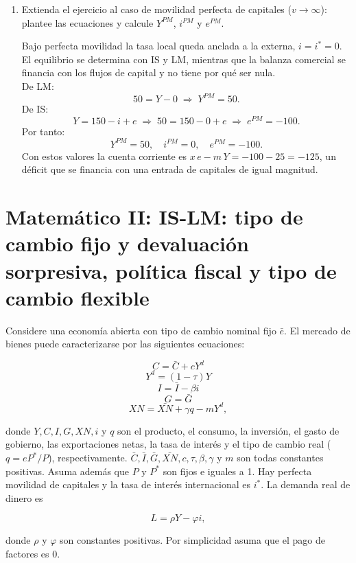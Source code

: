 \documentclass[a4paper]{article}
\begin{document}
\begin{enumerate}
  \item[c)] Extienda el ejercicio al caso de movilidad perfecta de capitales (\(v\to\infty\)): plantee las ecuaciones y calcule \(Y^{PM}\), \(i^{PM}\) y \(e^{PM}\).
  \begin{solution}
  Bajo perfecta movilidad la tasa local queda anclada a la externa, \(i = i^* = 0\). El equilibrio se determina con IS y LM, mientras que la balanza comercial se financia con los flujos de capital y no tiene por qué ser nula.\\
  De LM:
  \[
    50 = Y - 0
    \;\Longrightarrow\;
    Y^{PM} = 50.
  \]
  De IS:
  \[
    Y = 150 - i + e
    \;\Longrightarrow\;
    50 = 150 - 0 + e
    \;\Longrightarrow\;
    e^{PM} = -100.
  \]
  Por tanto:
  \[
    Y^{PM} = 50,\quad i^{PM} = 0,\quad e^{PM} = -100.
  \]
  Con estos valores la cuenta corriente es \(x\,e - m\,Y = -100 - 25 = -125\), un déficit que se financia con una entrada de capitales de igual magnitud.
  \end{solution}
\end{enumerate}

\section*{Matemático II: IS-LM: tipo de cambio fijo y devaluación sorpresiva, política fiscal y tipo de cambio flexible}

Considere una economía abierta con tipo de cambio nominal fijo $\bar{e}$. El mercado de bienes puede caracterizarse por las siguientes ecuaciones:

\[
C = \bar{C} + cY^d \tag{1}
\]
\[
Y^d = (1 - \tau)Y \tag{2}
\]
\[
I = \bar{I} - \beta i \tag{3}
\]
\[
G = \bar{G} \tag{4}
\]
\[
XN = \bar{XN} + \gamma q - mY^d, \tag{5}
\]

donde $Y, C, I, G, XN, i$ y $q$ son el producto, el consumo, la inversión, el gasto de gobierno, las exportaciones netas, la tasa de interés y el tipo de cambio real ($q = eP^*/P$), respectivamente. $\bar{C}, \bar{I}, \bar{G}, \bar{XN}, c, \tau, \beta, \gamma$ y $m$ son todas constantes positivas. Asuma además que $P$ y $P^*$ son fijos e iguales a 1. Hay perfecta movilidad de capitales y la tasa de interés internacional es $i^*$. La demanda real de dinero es

\[
L = \rho Y - \varphi i, \tag{6}
\]

donde $\rho$ y $\varphi$ son constantes positivas. Por simplicidad asuma que el pago de factores es 0.
\end{document}
